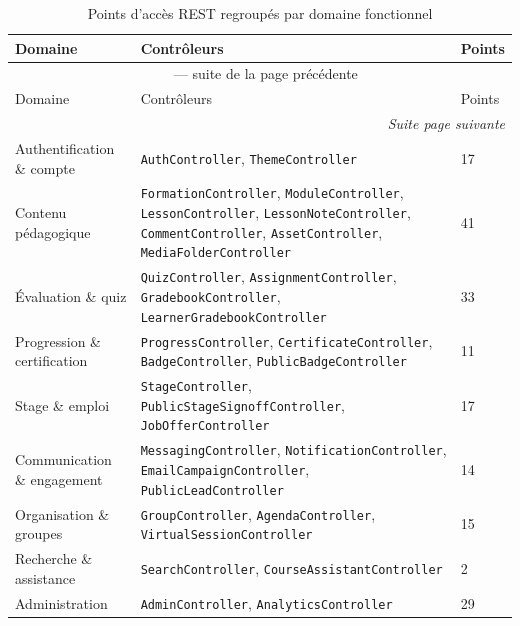 \documentclass[12pt,a4paper,oneside]{report}
\begin{document}
\begin{longtable}{|p{3.9cm}|p{6cm}|p{1.6cm}|}
  \caption{Points d'accès REST regroupés par domaine fonctionnel}
  \label{tab:api-domaines}\\
  \hline
  Domaine & Contrôleurs & Points \\
  \hline
  \endfirsthead
  \multicolumn{3}{c}{\tablename~\thetable{} --- suite de la page précédente}\\
  \hline
  Domaine & Contrôleurs & Points \\
  \hline
  \endhead
  \hline \multicolumn{3}{r}{\textit{Suite page suivante}} \\
  \endfoot
  \hline
  \endlastfoot
  Authentification \& compte & \texttt{AuthController}, \texttt{ThemeController} & 17 \\ \hline
  Contenu pédagogique & \texttt{FormationController}, \texttt{ModuleController}, \texttt{LessonController}, \texttt{LessonNoteController}, \texttt{CommentController}, \texttt{AssetController}, \texttt{MediaFolderController} & 41 \\ \hline
  Évaluation \& quiz & \texttt{QuizController}, \texttt{AssignmentController}, \texttt{GradebookController}, \texttt{LearnerGradebookController} & 33 \\ \hline
  Progression \& certification & \texttt{ProgressController}, \texttt{CertificateController}, \texttt{BadgeController}, \texttt{PublicBadgeController} & 11 \\ \hline
  Stage \& emploi & \texttt{StageController}, \texttt{PublicStageSignoffController}, \texttt{JobOfferController} & 17 \\ \hline
  Communication \& engagement & \texttt{MessagingController}, \texttt{NotificationController}, \texttt{EmailCampaignController}, \texttt{PublicLeadController} & 14 \\ \hline
  Organisation \& groupes & \texttt{GroupController}, \texttt{AgendaController}, \texttt{VirtualSessionController} & 15 \\ \hline
  Recherche \& assistance & \texttt{SearchController}, \texttt{CourseAssistantController} & 2 \\ \hline
  Administration & \texttt{AdminController}, \texttt{AnalyticsController} & 29 \\ \hline
\end{longtable}

\end{document}
